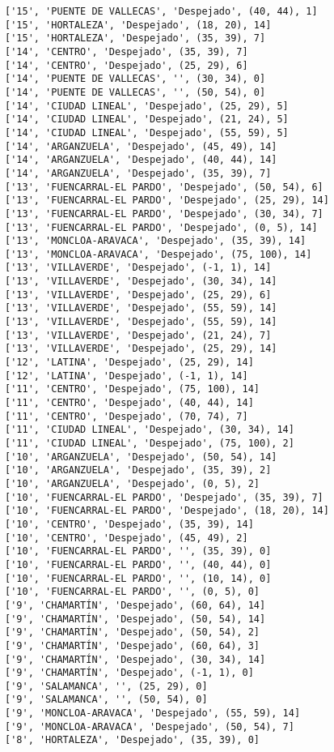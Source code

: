\documentclass[11pt]{article}
\begin{document}
\begin{Verbatim}[commandchars=\\\{\}]
['15', 'PUENTE DE VALLECAS', 'Despejado', (40, 44), 1]
['15', 'HORTALEZA', 'Despejado', (18, 20), 14]
['15', 'HORTALEZA', 'Despejado', (35, 39), 7]
['14', 'CENTRO', 'Despejado', (35, 39), 7]
['14', 'CENTRO', 'Despejado', (25, 29), 6]
['14', 'PUENTE DE VALLECAS', '', (30, 34), 0]
['14', 'PUENTE DE VALLECAS', '', (50, 54), 0]
['14', 'CIUDAD LINEAL', 'Despejado', (25, 29), 5]
['14', 'CIUDAD LINEAL', 'Despejado', (21, 24), 5]
['14', 'CIUDAD LINEAL', 'Despejado', (55, 59), 5]
['14', 'ARGANZUELA', 'Despejado', (45, 49), 14]
['14', 'ARGANZUELA', 'Despejado', (40, 44), 14]
['14', 'ARGANZUELA', 'Despejado', (35, 39), 7]
['13', 'FUENCARRAL-EL PARDO', 'Despejado', (50, 54), 6]
['13', 'FUENCARRAL-EL PARDO', 'Despejado', (25, 29), 14]
['13', 'FUENCARRAL-EL PARDO', 'Despejado', (30, 34), 7]
['13', 'FUENCARRAL-EL PARDO', 'Despejado', (0, 5), 14]
['13', 'MONCLOA-ARAVACA', 'Despejado', (35, 39), 14]
['13', 'MONCLOA-ARAVACA', 'Despejado', (75, 100), 14]
['13', 'VILLAVERDE', 'Despejado', (-1, 1), 14]
['13', 'VILLAVERDE', 'Despejado', (30, 34), 14]
['13', 'VILLAVERDE', 'Despejado', (25, 29), 6]
['13', 'VILLAVERDE', 'Despejado', (55, 59), 14]
['13', 'VILLAVERDE', 'Despejado', (55, 59), 14]
['13', 'VILLAVERDE', 'Despejado', (21, 24), 7]
['13', 'VILLAVERDE', 'Despejado', (25, 29), 14]
['12', 'LATINA', 'Despejado', (25, 29), 14]
['12', 'LATINA', 'Despejado', (-1, 1), 14]
['11', 'CENTRO', 'Despejado', (75, 100), 14]
['11', 'CENTRO', 'Despejado', (40, 44), 14]
['11', 'CENTRO', 'Despejado', (70, 74), 7]
['11', 'CIUDAD LINEAL', 'Despejado', (30, 34), 14]
['11', 'CIUDAD LINEAL', 'Despejado', (75, 100), 2]
['10', 'ARGANZUELA', 'Despejado', (50, 54), 14]
['10', 'ARGANZUELA', 'Despejado', (35, 39), 2]
['10', 'ARGANZUELA', 'Despejado', (0, 5), 2]
['10', 'FUENCARRAL-EL PARDO', 'Despejado', (35, 39), 7]
['10', 'FUENCARRAL-EL PARDO', 'Despejado', (18, 20), 14]
['10', 'CENTRO', 'Despejado', (35, 39), 14]
['10', 'CENTRO', 'Despejado', (45, 49), 2]
['10', 'FUENCARRAL-EL PARDO', '', (35, 39), 0]
['10', 'FUENCARRAL-EL PARDO', '', (40, 44), 0]
['10', 'FUENCARRAL-EL PARDO', '', (10, 14), 0]
['10', 'FUENCARRAL-EL PARDO', '', (0, 5), 0]
['9', 'CHAMARTÍN', 'Despejado', (60, 64), 14]
['9', 'CHAMARTÍN', 'Despejado', (50, 54), 14]
['9', 'CHAMARTÍN', 'Despejado', (50, 54), 2]
['9', 'CHAMARTÍN', 'Despejado', (60, 64), 3]
['9', 'CHAMARTÍN', 'Despejado', (30, 34), 14]
['9', 'CHAMARTÍN', 'Despejado', (-1, 1), 0]
['9', 'SALAMANCA', '', (25, 29), 0]
['9', 'SALAMANCA', '', (50, 54), 0]
['9', 'MONCLOA-ARAVACA', 'Despejado', (55, 59), 14]
['9', 'MONCLOA-ARAVACA', 'Despejado', (50, 54), 7]
['8', 'HORTALEZA', 'Despejado', (35, 39), 0]

\end{Verbatim}
\end{document}
